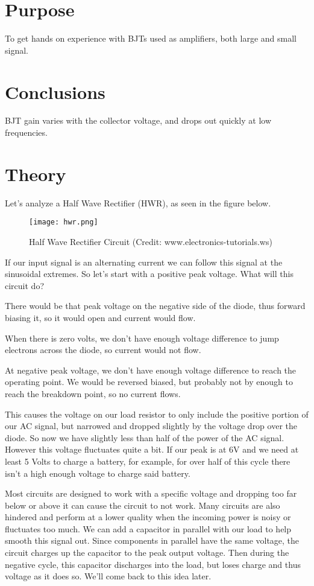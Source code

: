 \documentclass[prb,preprint]{revtex4-1}
\begin{document}
\section{Purpose}
To get hands on experience with BJTs used as amplifiers, both large and small signal.

\section{Conclusions}
BJT gain varies with the collector voltage, and drops out quickly at low frequencies.

\section{Theory}
Let's analyze a Half Wave Rectifier (HWR), as seen in the figure below. 

\begin{figure}[ht]
\centering
\texttt{[image: hwr.png]}
\caption{Half Wave Rectifier Circuit (Credit: www.electronics-tutorials.ws)}
\label{fig1}
\end{figure}

If our input signal is an alternating current we can follow this signal at the sinusoidal extremes. So let's start with a positive peak voltage. What will this circuit do?

There would be that peak voltage on the negative side of the diode, thus forward biasing it, so it would open and current would flow.

When there is zero volts, we don't have enough voltage difference to jump electrons across the diode, so current would not flow.

At negative peak voltage, we don't have enough voltage difference to reach the operating point. We would be reversed biased, but probably not by enough to reach the breakdown point, so no current flows.

This causes the voltage on our load resistor to only include the positive portion of our AC signal, but narrowed and dropped slightly by the voltage drop over the diode. So now we have slightly less than half of the power of the AC signal. However this voltage fluctuates quite a bit. If our peak is at 6V and we need at least 5 Volts to charge a battery, for example, for over half of this cycle there isn't a high enough voltage to charge said battery.

Most circuits are designed to work with a specific voltage and dropping too far below or above it can cause the circuit to not work. Many circuits are also hindered and perform at a lower quality when the incoming power is noisy or fluctuates too much. We can add a capacitor in parallel with our load to help smooth this signal out. Since components in parallel have the same voltage, the circuit charges up the capacitor to the peak output voltage. Then during the negative cycle, this capacitor discharges into the load, but loses charge and thus voltage as it does so. We'll come back to this idea later.
\end{document}
